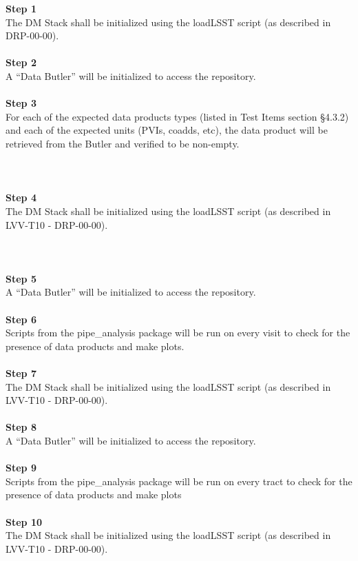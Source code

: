 \textbf{Step 1}\\
The DM Stack shall be initialized using the loadLSST script (as
described in DRP-00-00).\\
~\\
\textbf{Step 2}\\
A ``Data Butler'' will be initialized to access the repository.\\
~\\
\textbf{Step 3}\\
For each of the expected data products types (listed in Test Items
section §4.3.2) and each of the expected units (PVIs, coadds, etc), the
data product will be retrieved from the Butler and verified to be
non-empty.\\
~\\
~\\
~\\
\textbf{Step 4}\\
The DM Stack shall be initialized using the loadLSST script (as
described in LVV-T10 - DRP-00-00).\\
~\\
~\\
~\\
\textbf{Step 5}\\
A ``Data Butler'' will be initialized to access the repository.\\
~\\
\textbf{Step 6}\\
Scripts from the pipe\_analysis package will be run on every visit to
check for the presence of data products and make plots.\\
~\\
\textbf{Step 7}\\
The DM Stack shall be initialized using the loadLSST script (as
described in LVV-T10 - DRP-00-00).\\
~\\
\textbf{Step 8}\\
A ``Data Butler'' will be initialized to access the repository.\\
~\\
\textbf{Step 9}\\
Scripts from the pipe\_analysis package will be run on every tract to
check for the presence of data products and make plots\\
~\\
\textbf{Step 10}\\
The DM Stack shall be initialized using the loadLSST script (as
described in LVV-T10 - DRP-00-00).\\
